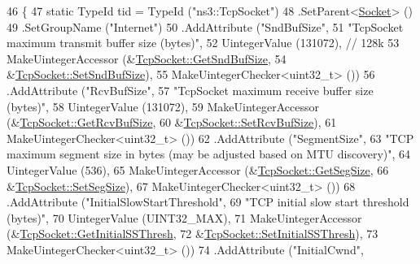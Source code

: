 \begin{DoxyCode}
46 \{
47   \textcolor{keyword}{static} TypeId tid = TypeId (\textcolor{stringliteral}{"ns3::TcpSocket"})
48     .SetParent<\hyperlink{classns3_1_1Socket_a1e22267afc490a4b15b8a764289a4000}{Socket}> ()
49     .SetGroupName (\textcolor{stringliteral}{"Internet"})
50     .AddAttribute (\textcolor{stringliteral}{"SndBufSize"},
51                    \textcolor{stringliteral}{"TcpSocket maximum transmit buffer size (bytes)"},
52                    UintegerValue (131072), \textcolor{comment}{// 128k}
53                    MakeUintegerAccessor (&\hyperlink{classns3_1_1TcpSocket_ab214c236e683f88ea8dc38d564dd54bc}{TcpSocket::GetSndBufSize},
54                                          &\hyperlink{classns3_1_1TcpSocket_ab82368990962d308cd4572129b5e1f85}{TcpSocket::SetSndBufSize}),
55                    MakeUintegerChecker<uint32\_t> ())
56     .AddAttribute (\textcolor{stringliteral}{"RcvBufSize"},
57                    \textcolor{stringliteral}{"TcpSocket maximum receive buffer size (bytes)"},
58                    UintegerValue (131072),
59                    MakeUintegerAccessor (&\hyperlink{classns3_1_1TcpSocket_ab71a79da5991d3c789be3d72a89429a5}{TcpSocket::GetRcvBufSize},
60                                          &\hyperlink{classns3_1_1TcpSocket_a16cf22dda11f238c7a4f71501c01ca9a}{TcpSocket::SetRcvBufSize}),
61                    MakeUintegerChecker<uint32\_t> ())
62     .AddAttribute (\textcolor{stringliteral}{"SegmentSize"},
63                    \textcolor{stringliteral}{"TCP maximum segment size in bytes (may be adjusted based on MTU discovery)"},
64                    UintegerValue (536),
65                    MakeUintegerAccessor (&\hyperlink{classns3_1_1TcpSocket_a86014de940c3824e18e96cf04b74fe55}{TcpSocket::GetSegSize},
66                                          &\hyperlink{classns3_1_1TcpSocket_a9328f877a2c8659298d363b11e8689c1}{TcpSocket::SetSegSize}),
67                    MakeUintegerChecker<uint32\_t> ())
68     .AddAttribute (\textcolor{stringliteral}{"InitialSlowStartThreshold"},
69                    \textcolor{stringliteral}{"TCP initial slow start threshold (bytes)"},
70                    UintegerValue (UINT32\_MAX),
71                    MakeUintegerAccessor (&\hyperlink{classns3_1_1TcpSocket_a5536c0feb21d1f0e555cf1f7725e14a4}{TcpSocket::GetInitialSSThresh},
72                                          &\hyperlink{classns3_1_1TcpSocket_a068de8f7bcb9864c95d8c722d8d56e5f}{TcpSocket::SetInitialSSThresh}),
73                    MakeUintegerChecker<uint32\_t> ())
74     .AddAttribute (\textcolor{stringliteral}{"InitialCwnd"},

\end{DoxyCode}
